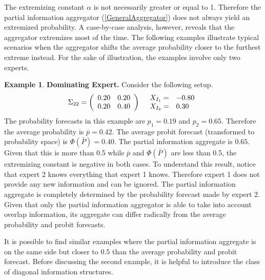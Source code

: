 \documentclass[11pt,twoside]{article}
\theoremstyle{definition}
\newtheorem{example}[theorem]{Example}
\theoremstyle{definition}
\begin{document}
The extremizing constant $\alpha$ is not necessarily greater or equal to 1. Therefore the partial information aggregator (\ref{GeneralAggregator}) does not always yield an extremized probability. A case-by-case analysis, however, reveals that the aggregator extremizes most of the time. The following examples illustrate typical scenarios when the aggregator shifts the average probability closer to the furthest extreme instead. For the sake of illustration, the examples involve only two experts. 



\begin{example}
\textbf{Dominating Expert.} Consider the following setup.
\begin{align*}
\Sigma_{22} =  \left(\begin{array}{c c}
0.20 & 0.20\\
0.20 & 0.40 \\
 \end{array}\right)
  && 
  \begin{array}{l l}
X_{I_1} =& -0.80\\
X_{I_2} =& 0.30
 \end{array}
\end{align*}
The probability forecasts in this example are $p_1 = 0.19$ and $p_2 = 0.65$. Therefore the average probability is $\bar{p} = 0.42$. The average probit forecast (transformed to probability space) is $\Phi(\bar{P}) = 0.40$. 
The partial information aggregate is $0.65$.  Given that this is more than 0.5 while $\bar{p}$ and $\Phi(\bar{P})$ are less than 0.5, the extremizing constant is negative in both cases. To understand this result, notice that expert 2 knows everything that expert 1 knows. Therefore expert 1 does not provide any new information and can be ignored. The partial information aggregate is completely determined by the probability forecast made by expert 2. Given that only the partial information aggregator is able to take into account overlap information, its aggregate can differ radically from the average probability and probit forecasts. 
\end{example}
It is possible to find similar examples where the partial information aggregate is on the same side but closer to 0.5 than the average probability and probit forecast. Before discussing the second example, it is helpful to introduce the class of diagonal information structures. 
\end{document}

